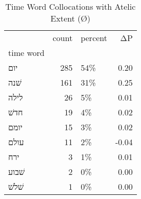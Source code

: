 \begin{table}[htbp!]
\centering
\caption{Time Word Collocations with Atelic Extent (Ø)}
\label{table:atelØ_head_cpd}
\begin{tabular}{lrlr}
\toprule
{} &  count & percent &    ΔP \\
time word &        &         &       \\
\midrule
יום       &    285 &     54\% &  0.20 \\
שׁנה      &    161 &     31\% &  0.25 \\
לילה      &     26 &      5\% &  0.01 \\
חדשׁ      &     19 &      4\% &  0.02 \\
יומם      &     15 &      3\% &  0.02 \\
עולם      &     11 &      2\% & -0.04 \\
ירח       &      3 &      1\% &  0.01 \\
שׁבוע     &      2 &      0\% &  0.00 \\
שׁלשׁ     &      1 &      0\% &  0.00 \\
\bottomrule
\end{tabular}
\end{table}
